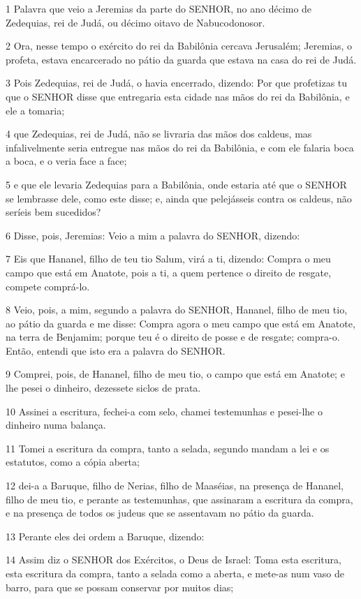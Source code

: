 \par 1 Palavra que veio a Jeremias da parte do SENHOR, no ano décimo de Zedequias, rei de Judá, ou décimo oitavo de Nabucodonosor.
\par 2 Ora, nesse tempo o exército do rei da Babilônia cercava Jerusalém; Jeremias, o profeta, estava encarcerado no pátio da guarda que estava na casa do rei de Judá.
\par 3 Pois Zedequias, rei de Judá, o havia encerrado, dizendo: Por que profetizas tu que o SENHOR disse que entregaria esta cidade nas mãos do rei da Babilônia, e ele a tomaria;
\par 4 que Zedequias, rei de Judá, não se livraria das mãos dos caldeus, mas infalivelmente seria entregue nas mãos do rei da Babilônia, e com ele falaria boca a boca, e o veria face a face;
\par 5 e que ele levaria Zedequias para a Babilônia, onde estaria até que o SENHOR se lembrasse dele, como este disse; e, ainda que pelejásseis contra os caldeus, não seríeis bem sucedidos?
\par 6 Disse, pois, Jeremias: Veio a mim a palavra do SENHOR, dizendo:
\par 7 Eis que Hananel, filho de teu tio Salum, virá a ti, dizendo: Compra o meu campo que está em Anatote, pois a ti, a quem pertence o direito de resgate, compete comprá-lo.
\par 8 Veio, pois, a mim, segundo a palavra do SENHOR, Hananel, filho de meu tio, ao pátio da guarda e me disse: Compra agora o meu campo que está em Anatote, na terra de Benjamim; porque teu é o direito de posse e de resgate; compra-o. Então, entendi que isto era a palavra do SENHOR.
\par 9 Comprei, pois, de Hananel, filho de meu tio, o campo que está em Anatote; e lhe pesei o dinheiro, dezessete siclos de prata.
\par 10 Assinei a escritura, fechei-a com selo, chamei testemunhas e pesei-lhe o dinheiro numa balança.
\par 11 Tomei a escritura da compra, tanto a selada, segundo mandam a lei e os estatutos, como a cópia aberta;
\par 12 dei-a a Baruque, filho de Nerias, filho de Maaséias, na presença de Hananel, filho de meu tio, e perante as testemunhas, que assinaram a escritura da compra, e na presença de todos os judeus que se assentavam no pátio da guarda.
\par 13 Perante eles dei ordem a Baruque, dizendo:
\par 14 Assim diz o SENHOR dos Exércitos, o Deus de Israel: Toma esta escritura, esta escritura da compra, tanto a selada como a aberta, e mete-as num vaso de barro, para que se possam conservar por muitos dias;
